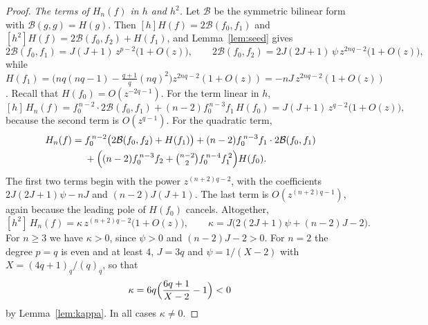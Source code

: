 \documentclass[11pt]{article}
\theoremstyle{definition}
\theoremstyle{remark}
\numberwithin{equation}{section}
\newcommand{\Bil}{\mathcal B}
\begin{document}
\begin{proof}
\emph{The terms of \(H_n(f)\) in \(h\) and \(h^2\).} Let
\(\Bil\) be the symmetric bilinear form with \(\Bil(g,g)=H(g)\). Then
\([h]H(f)=2\Bil(f_0,f_1)\) and \([h^2]H(f)=2\Bil(f_0,f_2)+H(f_1)\), and
Lemma~\ref{lem:seed} gives
\[
 2\Bil(f_0,f_1)=J(J+1)\,z^{p-2}\bigl(1+O(z)\bigr),\qquad
 2\Bil(f_0,f_2)=2J(2J+1)\,\psi\,z^{2nq-2}\bigl(1+O(z)\bigr),
\]
while
\(H(f_1)=\bigl(nq(nq-1)-\tfrac{q+1}{q}(nq)^2\bigr)z^{2nq-2}(1+O(z))
=-nJ\,z^{2nq-2}(1+O(z))\). Recall that \(H(f_0)=O(z^{-2q-1})\). For the
term linear in \(h\),
\[
 [h]\,H_n(f)=f_0^{\,n-2}\cdot2\Bil(f_0,f_1)+(n-2)f_0^{\,n-3}f_1\,H(f_0)
 =J(J+1)\,z^{q-2}\bigl(1+O(z)\bigr),
\]
because the second term is \(O(z^{q-1})\). For the quadratic term,
\begin{align*}
 [h^2]\,H_n(f)={}&f_0^{\,n-2}\bigl(2\Bil(f_0,f_2)+H(f_1)\bigr)
 +(n-2)f_0^{\,n-3}f_1\cdot2\Bil(f_0,f_1)\\
 &+\Bigl((n-2)f_0^{\,n-3}f_2+\tbinom{n-2}{2}f_0^{\,n-4}f_1^{\,2}\Bigr)H(f_0).
\end{align*}
The first two terms begin with the power \(z^{(n+2)q-2}\), with the
coefficients \(2J(2J+1)\psi-nJ\) and \((n-2)J(J+1)\). The last term is
\(O(z^{(n+2)q-1})\), again because the leading pole of \(H(f_0)\)
cancels. Altogether,
\begin{equation}\label{eq:kappa}
 [h^2]\,H_n(f)=\kappa\,z^{(n+2)q-2}\bigl(1+O(z)\bigr),\qquad
 \kappa=J\bigl(2(2J+1)\psi+(n-2)J-2\bigr).
\end{equation}
For \(n\ge3\) we have \(\kappa>0\), since \(\psi>0\) and
\((n-2)J-2>0\). For \(n=2\) the degree \(p=q\) is even and at least
\(4\), \(J=3q\) and \(\psi=1/(X-2)\) with \(X=(4q+1)_q/(q)_q\), so that
\[
 \kappa=6q\Bigl(\frac{6q+1}{X-2}-1\Bigr)<0
\]
by Lemma~\ref{lem:kappa}. In all cases \(\kappa\ne0\).


\end{proof}
\end{document}
